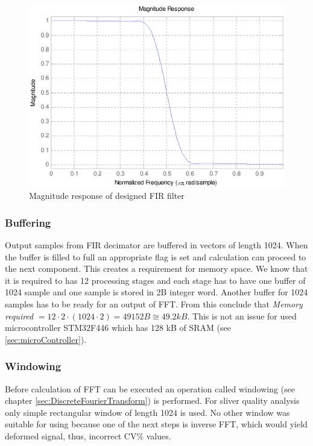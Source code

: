 \documentclass[twoside]{ctuthesis}
\theoremstyle{plain}
\theoremstyle{definition}
\theoremstyle{note}
\begin{document}
\begin{figure}[h]
	\centering
	\includegraphics[width=1.0\textwidth]{magnitudeResponse.eps}
	\caption{Magnitude response of designed FIR filter}
	\label{fig:MagnitudeResponse}
\end{figure}

\subsubsection{Buffering}
Output samples from FIR decimator are buffered in vectors of length 1024. When the buffer is filled to full an appropriate flag is set and calculation can proceed to the next component. This creates a requirement for memory space. We know that it is required to has 12 processing stages and each stage has to have one buffer of 1024 sample and one sample is stored in 2B integer word. Another buffer for 1024 samples has to be ready for an output of FFT. From this conclude that \textit{Memory required} $= 12 \cdot 2 \cdot(1024 \cdot 2)=49152B\cong49.2kB$. This is not an issue for used microcontroller STM32F446 which has 128 kB of SRAM (see \ref{sec:microController}).

\subsubsection{Windowing}
Before calculation of FFT can be executed an operation called windowing (see chapter \ref{sec:DiscreteFourierTransform}) is performed. For sliver quality analysis only simple rectangular window of length 1024 is used. No other window was suitable for using because one of the next steps is inverse FFT, which would yield deformed signal, thus, incorrect CV\% values.
\end{document}
